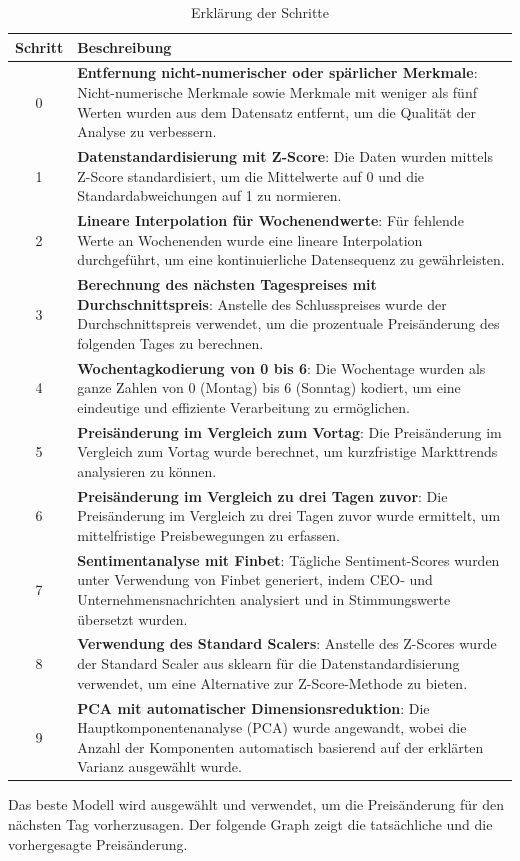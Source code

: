 \begin{table}[H]
    \begin{tabularx}{\textwidth}{|c|X|}
        \hline
        \rowcolor{lightgray}
        \textbf{Schritt} & \textbf{Beschreibung} \\ \hline
        0 & \textbf{Entfernung nicht-numerischer oder spärlicher Merkmale}: Nicht-numerische Merkmale sowie Merkmale mit weniger als fünf Werten wurden aus dem Datensatz entfernt, um die Qualität der Analyse zu verbessern. \\ \hline
        1 & \textbf{Datenstandardisierung mit Z-Score}: Die Daten wurden mittels Z-Score standardisiert, um die Mittelwerte auf 0 und die Standardabweichungen auf 1 zu normieren. \\ \hline
        2 & \textbf{Lineare Interpolation für Wochenendwerte}: Für fehlende Werte an Wochenenden wurde eine lineare Interpolation durchgeführt, um eine kontinuierliche Datensequenz zu gewährleisten. \\ \hline
        3 & \textbf{Berechnung des nächsten Tagespreises mit Durchschnittspreis}: Anstelle des Schlusspreises wurde der Durchschnittspreis verwendet, um die prozentuale Preisänderung des folgenden Tages zu berechnen. \\ \hline
        4 & \textbf{Wochentagkodierung von 0 bis 6}: Die Wochentage wurden als ganze Zahlen von 0 (Montag) bis 6 (Sonntag) kodiert, um eine eindeutige und effiziente Verarbeitung zu ermöglichen. \\ \hline
        5 & \textbf{Preisänderung im Vergleich zum Vortag}: Die Preisänderung im Vergleich zum Vortag wurde berechnet, um kurzfristige Markttrends analysieren zu können. \\ \hline
        6 & \textbf{Preisänderung im Vergleich zu drei Tagen zuvor}: Die Preisänderung im Vergleich zu drei Tagen zuvor wurde ermittelt, um mittelfristige Preisbewegungen zu erfassen. \\ \hline
        7 & \textbf{Sentimentanalyse mit Finbet}: Tägliche Sentiment-Scores wurden unter Verwendung von Finbet generiert, indem CEO- und Unternehmensnachrichten analysiert und in Stimmungswerte übersetzt wurden. \\ \hline
        8 & \textbf{Verwendung des Standard Scalers}: Anstelle des Z-Scores wurde der Standard Scaler aus sklearn für die Datenstandardisierung verwendet, um eine Alternative zur Z-Score-Methode zu bieten. \\ \hline
        9 & \textbf{PCA mit automatischer Dimensionsreduktion}: Die Hauptkomponentenanalyse (PCA) wurde angewandt, wobei die Anzahl der Komponenten automatisch basierend auf der erklärten Varianz ausgewählt wurde. \\ \hline
    \end{tabularx}
    \caption{Erklärung der Schritte}
    \label{tab:erklaerung_der_schritte}
\end{table}
Das beste Modell wird ausgewählt und verwendet, um die Preisänderung für den nächsten Tag vorherzusagen. Der folgende Graph zeigt die tatsächliche und die vorhergesagte Preisänderung.

